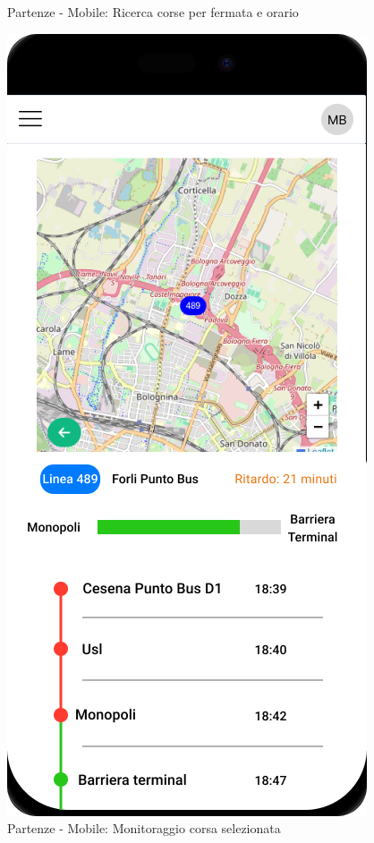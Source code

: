 \begin{figure}[H]
\begin{minipage}[b]{0.45\textwidth}
    \caption{Partenze - Mobile: Ricerca corse per fermata e orario}
    \label{fig:partenze-ricerca}
  \end{minipage}
  \hfill
  \begin{minipage}[b]{0.45\textwidth}
    \centering
    \includegraphics[width=\textwidth]{images/mockup/Monitoraggio linea.png}
    \caption{Partenze - Mobile: Monitoraggio corsa selezionata}
    \label{fig:partenze-monitoraggio}
  \end{minipage}
\end{figure}

